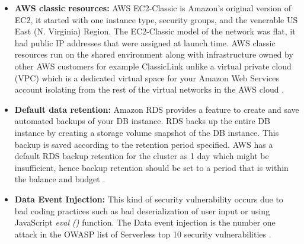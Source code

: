 \begin{itemize}
    \item \textbf{AWS classic resources:} AWS EC2-Classic is Amazon's original version of EC2,
    it started with one instance type, security groups, and the venerable US East (N. Virginia) Region.
    The EC2-Classic model of the network was flat, it had public IP addresses that were assigned at launch time.
    AWS classic resources run on the shared environment along with infrastructure owned by other AWS customers for
    example ClassicLink unlike a virtual private cloud (VPC) which is a dedicated virtual space for your Amazon Web Services account isolating from the rest of the virtual networks in the AWS cloud \cite{60}.
\end{itemize}

\begin{itemize}
    \item \textbf{Default data retention:} Amazon RDS provides a feature to create and save automated backups of your DB
    instance.
    RDS backs up the entire DB instance by creating a storage volume snapshot of the DB instance.
    This
    backup is saved according to the retention period specified.
    AWS has a default RDS backup retention for the
    cluster as 1 day which might be insufficient, hence backup retention should be set to a period that
    is within the balance and budget \cite{35} \cite{39}.
\end{itemize}

\begin{itemize}
    \item \textbf{Data Event Injection:} This kind of security vulnerability occurs due to bad coding practices such
    as bad
    deserialization of user input or using JavaScript \textit{eval ()} function.
    The Data event injection is the
    number
    one
    attack in the OWASP list of Serverless top 10 security vulnerabilities \cite{59}.
\end{itemize}

